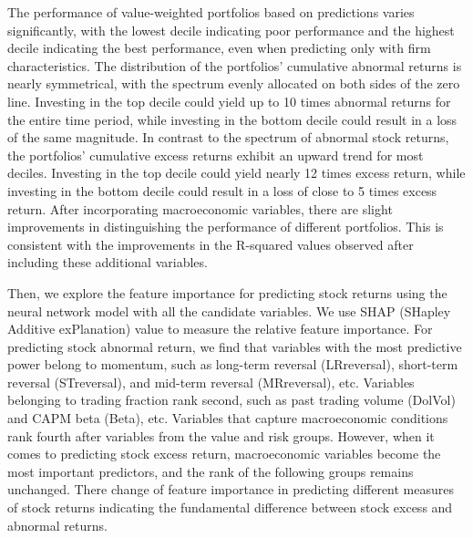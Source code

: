 The performance of value-weighted portfolios based on predictions varies significantly, with the lowest decile indicating poor performance and the highest decile indicating the best performance, even when predicting only with firm characteristics. The distribution of the portfolios' cumulative abnormal returns is nearly symmetrical, with the spectrum evenly allocated on both sides of the zero line. Investing in the top decile could yield up to 10 times abnormal returns for the entire time period, while investing in the bottom decile could result in a loss of the same magnitude. In contrast to the spectrum of abnormal stock returns, the portfolios' cumulative excess returns exhibit an upward trend for most deciles. Investing in the top decile could yield nearly 12 times excess return, while investing in the bottom decile could result in a loss of close to 5 times excess return. After incorporating macroeconomic variables, there are slight improvements in distinguishing the performance of different portfolios. This is consistent with the improvements in the R-squared values observed after including these additional variables.

Then, we explore the feature importance for predicting stock returns using the neural network model with all the candidate variables. We use SHAP (SHapley Additive exPlanation) value to measure the relative feature importance. For predicting stock abnormal return, we find that variables with the most predictive power belong to momentum, such as long-term reversal (LRreversal), short-term reversal (STreversal), and mid-term reversal (MRreversal), etc. Variables belonging to trading fraction rank second, such as past trading volume (DolVol) and CAPM beta (Beta), etc. Variables that capture macroeconomic conditions rank fourth after variables from the value and risk groups. However, when it comes to predicting stock excess return, macroeconomic variables become the most important predictors, and the rank of the following groups remains unchanged. There change of feature importance in predicting different measures of stock returns indicating the fundamental difference between stock excess and abnormal returns.

